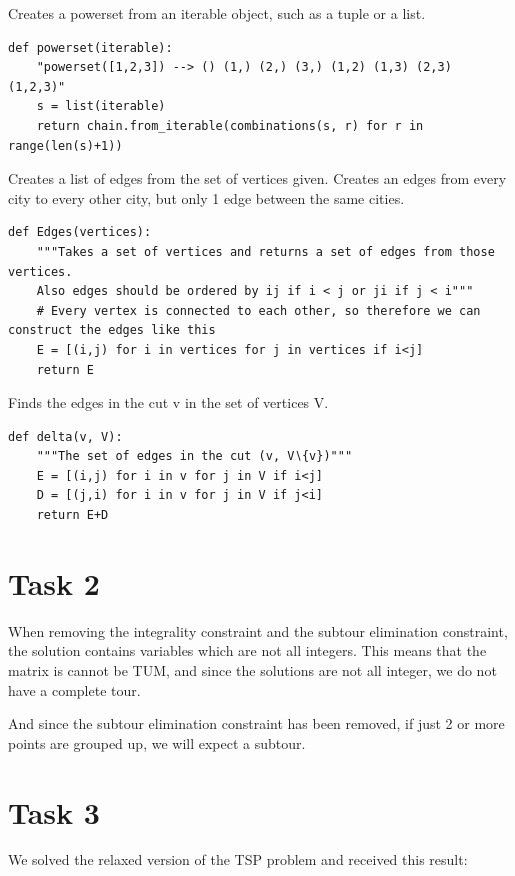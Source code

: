 \documentclass[a4paper,10pt]{article}
\begin{document}
Creates a powerset from an iterable object, such as a tuple or a list.

\begin{lstlisting}
def powerset(iterable):
    "powerset([1,2,3]) --> () (1,) (2,) (3,) (1,2) (1,3) (2,3) (1,2,3)"
    s = list(iterable)
    return chain.from_iterable(combinations(s, r) for r in range(len(s)+1))
\end{lstlisting}

Creates a list of edges from the set of vertices given. Creates an edges from every city to every other city, but only 1 edge between the same cities.

\begin{lstlisting}
def Edges(vertices):
    """Takes a set of vertices and returns a set of edges from those vertices. 
    Also edges should be ordered by ij if i < j or ji if j < i"""
    # Every vertex is connected to each other, so therefore we can construct the edges like this
    E = [(i,j) for i in vertices for j in vertices if i<j]
    return E
\end{lstlisting}

Finds the edges in the cut v in the set of vertices V.

\begin{lstlisting}
def delta(v, V):
    """The set of edges in the cut (v, V∖{v})"""
    E = [(i,j) for i in v for j in V if i<j]
    D = [(j,i) for i in v for j in V if j<i]
    return E+D
\end{lstlisting}


\newpage
\section*{Task 2}


When removing the integrality constraint and the subtour elimination constraint, the solution contains variables which are not all integers. This means that the matrix is cannot be TUM, and since the solutions are not all integer, we do not have a complete tour.

And since the subtour elimination constraint has been removed, if just 2 or more points are grouped up, we will expect a subtour.

\newpage
\section*{Task 3}
We solved the relaxed version of the TSP problem and received this result:
\end{document}
